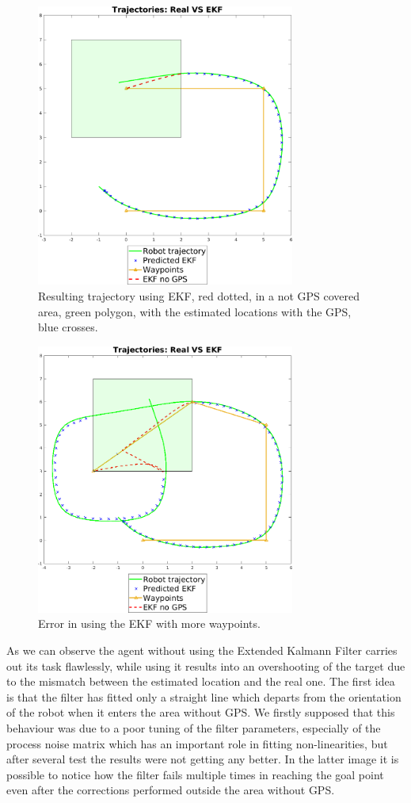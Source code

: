 \documentclass[twocolumn, a4paper]{article}
\begin{document}
\begin{figure}[h!]
    \centering
    \includegraphics[width=8.5cm]{"../Report_images/Trajectory_EKF.png"}
    \caption{Resulting trajectory using EKF, red dotted, in a not GPS covered
             area, green polygon, with the estimated locations with the GPS,
             blue crosses.}
    \label{fig:EKF_on}
\end{figure}
\begin{figure}[h!]
    \centering
    \includegraphics[width=8.5cm]{"../Report_images/Not_working_EKF_bad.png"}
    \caption{Error in using the EKF with more waypoints.}
    \label{fig:EKF_bad}
\end{figure}
\vspace{0.3cm}
As we can observe the agent without using the Extended Kalmann Filter carries
out its task flawlessly, while using it results into an overshooting of the
target due to the mismatch between the estimated location and the real one.
The first idea is that the filter has fitted only a straight line which
departs from the orientation of the robot when it enters the area without
GPS. We firstly supposed that this behaviour was due to a poor tuning of the
filter parameters, especially of the process noise matrix which has an 
important role in fitting non-linearities, but after several test the
results were not getting any better.
In the latter image it is possible to notice how the filter fails multiple
times in reaching the goal point even after the corrections performed
outside the area without GPS.
\end{document}
